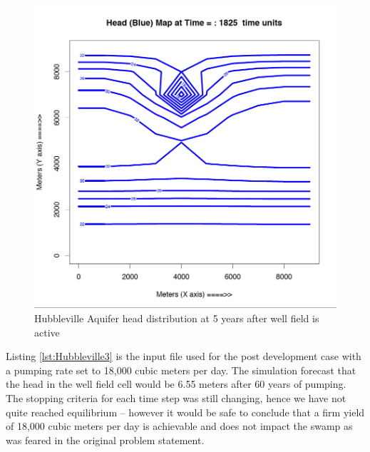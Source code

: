 \begin{figure}[h!] %
   \centering
   \includegraphics[width=6in]{./18-UnsteadyGroundwaterFlow/HubblevillePlot5PostDev.jpg} 
   \caption{Hubbleville Aquifer head distribution at 5 years after well field is active}
   \label{fig:HubblevillePlot5PostDev}
\end{figure}

Listing \ref{lst:Hubbleville3} is the input file used for the post development case with a pumping rate set to 18,000 cubic meters per day.
The simulation forecast that the head in the well field cell would be 6.55 meters after 60 years of pumping.  
The stopping criteria for each time step was still changing, hence we have not quite reached equilibrium -- however it would be safe to conclude that a firm yield of 18,000 cubic meters per day is achievable and does not impact the swamp as was feared in the original problem statement.

